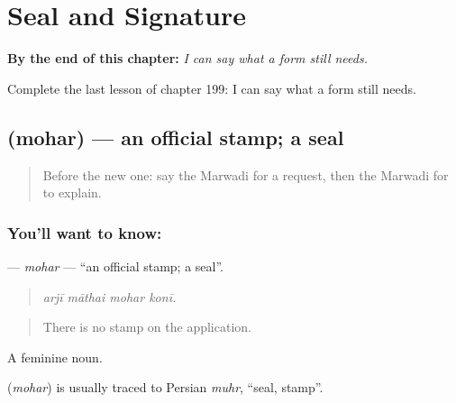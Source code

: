 
\chapter{Seal and Signature}
\label{ch:mw-seal-and-signature}

\begin{chapteropening}
\textbf{By the end of this chapter:} \emph{I can say what a form still needs.}

Complete the last lesson of chapter 199: I can say what a form still needs.
\end{chapteropening}

\section[\texorpdfstring{\mw{मोहर} (mohar)}{मोहर (mohar)}]{ (mohar) — an official stamp; a seal}

\label{lesson:MW-C199-mohar}



\begin{quote}
Before the new one: say the Marwadi for a request, then the Marwadi for to explain.
\end{quote}

\subsection*{You'll want to know: }
\textbf{} — \emph{mohar} — \textquotedblleft{}an official stamp; a seal\textquotedblright{}.

\begin{quote}
   
\end{quote}

\begin{quote}
\emph{arjī māthai mohar konī.}
\end{quote}

\begin{quote}
There is no stamp on the application.
\end{quote}

A feminine noun.

\begin{cousinweb}
\textbf{} (\emph{mohar}) is usually traced to Persian \emph{muhr}, \textquotedblleft{}seal, stamp\textquotedblright{}.
\end{cousinweb}

